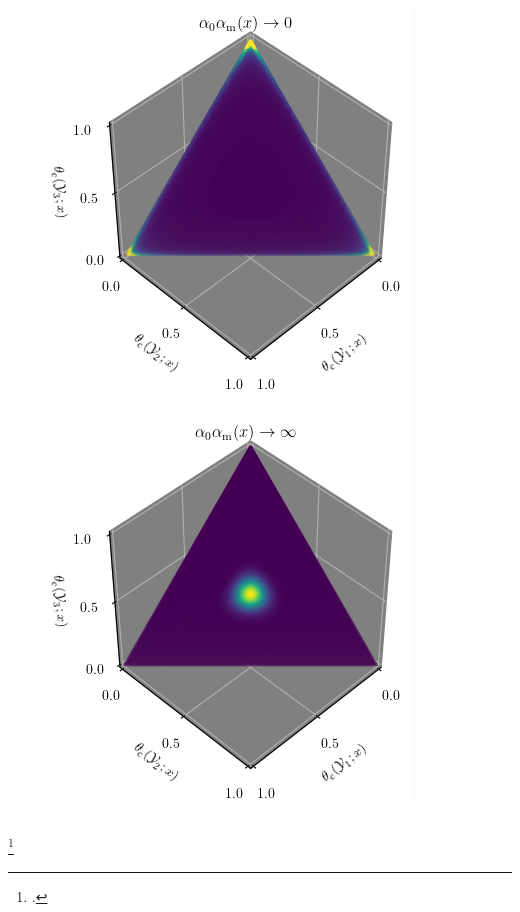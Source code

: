 \documentclass[aspectratio=169]{beamer}
\begin{document}
\begin{frame}
\begin{columns}[c]
\begin{column}{.3\linewidth}
\begin{figure}
\centering
\includegraphics[width=0.65\linewidth]{SSP_2021/presentation/dir_loc.png}
\end{figure}

\end{column}

\end{columns}

\footcitetext{ferguson}


\end{frame}
\end{document}
